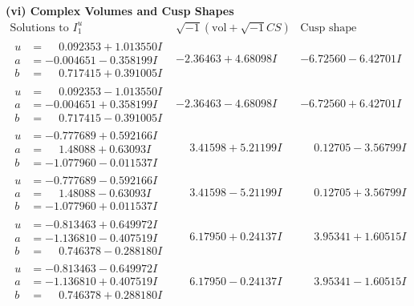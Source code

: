 \documentclass[1p]{elsarticle_modified}
\theoremstyle{definition}
\newcommand{\I}{\sqrt{-1}}
\begin{document}
\newpage\flushleft \textbf{(vi) Complex Volumes and Cusp Shapes}
$$\begin{array}{c|c|c}  
\text{Solutions to }I^u_{1}& \I (\text{vol} + \sqrt{-1}CS) & \text{Cusp shape}\\
 \hline 
\begin{aligned}
u &= \phantom{-}0.092353 + 1.013550 I \\
a &= -0.004651 - 0.358199 I \\
b &= \phantom{-}0.717415 + 0.391005 I\end{aligned}
 & -2.36463 + 4.68098 I & -6.72560 - 6.42701 I \\ \hline\begin{aligned}
u &= \phantom{-}0.092353 - 1.013550 I \\
a &= -0.004651 + 0.358199 I \\
b &= \phantom{-}0.717415 - 0.391005 I\end{aligned}
 & -2.36463 - 4.68098 I & -6.72560 + 6.42701 I \\ \hline\begin{aligned}
u &= -0.777689 + 0.592166 I \\
a &= \phantom{-}1.48088 + 0.63093 I \\
b &= -1.077960 - 0.011537 I\end{aligned}
 & \phantom{-}3.41598 + 5.21199 I & \phantom{-}0.12705 - 3.56799 I \\ \hline\begin{aligned}
u &= -0.777689 - 0.592166 I \\
a &= \phantom{-}1.48088 - 0.63093 I \\
b &= -1.077960 + 0.011537 I\end{aligned}
 & \phantom{-}3.41598 - 5.21199 I & \phantom{-}0.12705 + 3.56799 I \\ \hline\begin{aligned}
u &= -0.813463 + 0.649972 I \\
a &= -1.136810 - 0.407519 I \\
b &= \phantom{-}0.746378 - 0.288180 I\end{aligned}
 & \phantom{-}6.17950 + 0.24137 I & \phantom{-}3.95341 + 1.60515 I \\ \hline\begin{aligned}
u &= -0.813463 - 0.649972 I \\
a &= -1.136810 + 0.407519 I \\
b &= \phantom{-}0.746378 + 0.288180 I\end{aligned}
 & \phantom{-}6.17950 - 0.24137 I & \phantom{-}3.95341 - 1.60515 I \\ \hline\begin{aligned}

\end{aligned}
\end{array}$$
\end{document}
